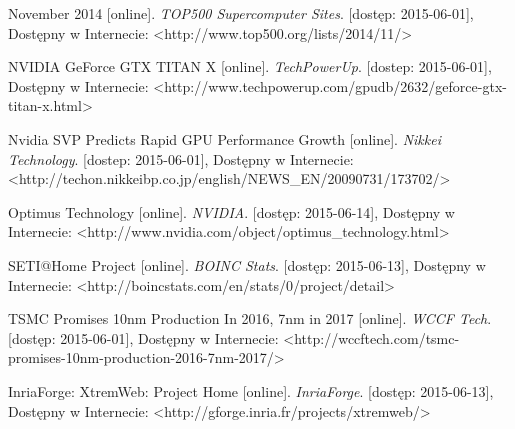 \documentclass[12pt,a4paper,twoside]{article}
\begin{document}
\begin{thebibliography}{99}
 November 2014 [online]. \textit{TOP500 Supercomputer Sites}. [dostęp: 2015-06-01], Dostępny w Internecie: <http://www.top500.org/lists/2014/11/>

 NVIDIA GeForce GTX TITAN X [online]. \textit{TechPowerUp}. [dostep: 2015-06-01], Dostępny w Internecie: <http://www.techpowerup.com/gpudb/2632/geforce-gtx-titan-x.html>

 Nvidia SVP Predicts Rapid GPU Performance Growth [online]. \textit{Nikkei Technology}. [dostep: 2015-06-01], Dostępny w Internecie: <http://techon.nikkeibp.co.jp/english/NEWS\_EN/20090731/173702/>

 Optimus Technology [online]. \textit{NVIDIA}. [dostęp: 2015-06-14], Dostępny w Internecie: <http://www.nvidia.com/object/optimus\_technology.html>

 SETI@Home Project [online]. \textit{BOINC Stats}. [dostęp: 2015-06-13], Dostępny w Internecie: <http://boincstats.com/en/stats/0/project/detail>

 TSMC Promises 10nm Production In 2016, 7nm in 2017 [online]. \textit{WCCF Tech}. [dostęp: 2015-06-01], Dostępny w Internecie: <http://wccftech.com/tsmc-promises-10nm-production-2016-7nm-2017/>

 InriaForge: XtremWeb: Project Home [online]. \textit{InriaForge}. [dostęp: 2015-06-13], Dostępny w Internecie: <http://gforge.inria.fr/projects/xtremweb/>

\end{thebibliography}
\endgroup
\end{document}
